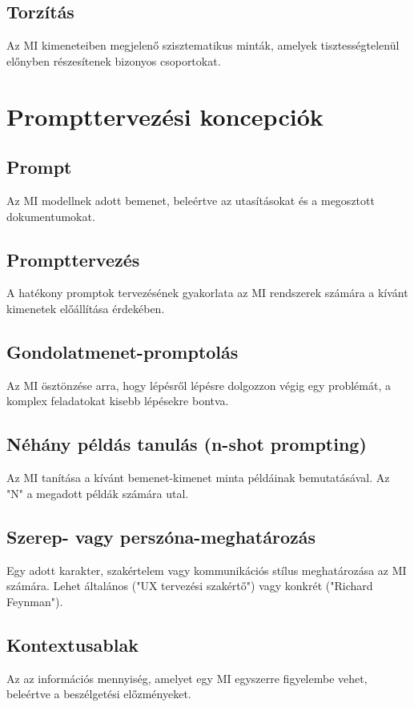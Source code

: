 \documentclass[a4paper, 11pt]{article}
\begin{document}
\begin{multicols}{2}
\subsection{Torzítás}
Az MI kimeneteiben megjelenő szisztematikus minták, amelyek tisztességtelenül előnyben részesítenek bizonyos csoportokat.

\section{Prompttervezési koncepciók}

\subsection{Prompt}
Az MI modellnek adott bemenet, beleértve az utasításokat és a megosztott dokumentumokat.

\subsection{Prompttervezés}
A hatékony promptok tervezésének gyakorlata az MI rendszerek számára a kívánt kimenetek előállítása érdekében.

\subsection{Gondolatmenet-promptolás}
Az MI ösztönzése arra, hogy lépésről lépésre dolgozzon végig egy problémát, a komplex feladatokat kisebb lépésekre bontva.

\subsection{Néhány példás tanulás (n-shot prompting)}
Az MI tanítása a kívánt bemenet-kimenet minta példáinak bemutatásával. Az "N" a megadott példák számára utal.

\subsection{Szerep- vagy perszóna-meghatározás}
Egy adott karakter, szakértelem vagy kommunikációs stílus meghatározása az MI számára. Lehet általános ("UX tervezési szakértő") vagy konkrét ("Richard Feynman").

\subsection{Kontextusablak}
Az az információs mennyiség, amelyet egy MI egyszerre figyelembe vehet, beleértve a beszélgetési előzményeket.


\end{multicols}
\end{document}
